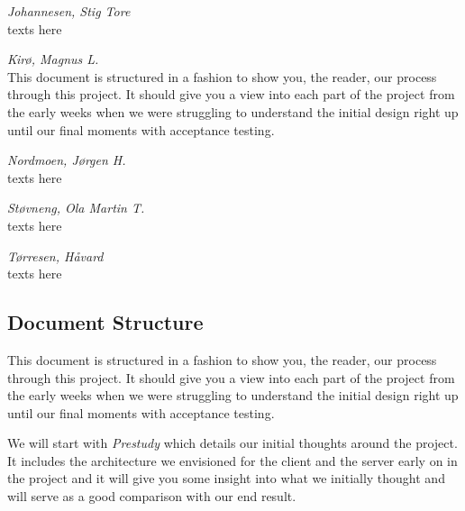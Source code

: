     \begin{Student}
    \textit{Johannesen, Stig Tore} \\
        texts here
        \\
    \end{Student}
    
    \begin{Student}
    \textit{Kirø, Magnus L.} \\
        This document is structured in a fashion to show you, the reader, our process through this project. It should give you a view into each part of the project from the early weeks when we were struggling to understand the initial design right up until our final moments with acceptance testing.
        \\
    \end{Student}
    
    \begin{Student}
    \textit{Nordmoen, Jørgen H.} \\
        texts here
        \\
    \end{Student}
    
    \begin{Student}
    \textit{Støvneng, Ola Martin T. } \\
        texts here
        \\
    \end{Student}
    
    \begin{Student}
    \textit{Tørresen, Håvard } \\
        texts here
        \\
    \end{Student}
    
    \subsection{Document Structure}\label{Document Structure}
    This document is structured in a fashion to show you, the reader, our process through this project. It should give you a view into each part of the project from the early weeks when we were struggling to understand the initial design right up until our final moments with acceptance testing. 
    
    We will start with \emph{Prestudy} which details our initial thoughts around the project. It includes the architecture we envisioned for the client and the server early on in the project and it will give you some insight into what we initially thought and will serve as a good comparison with our end result.
    

